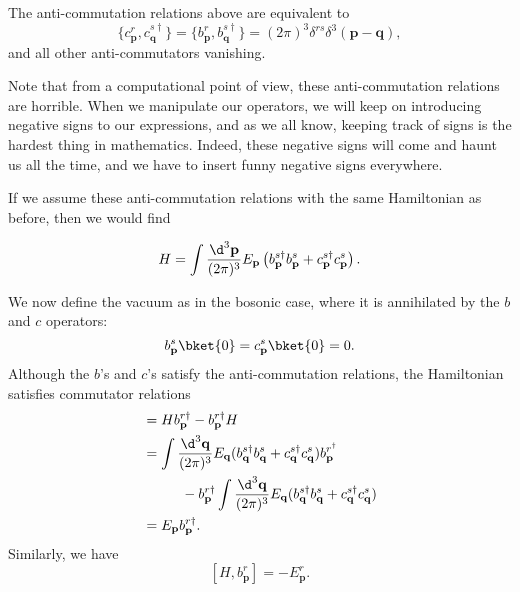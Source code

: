 \documentclass[a4paper]{article}
\begin{document}
\begin{prop}
  The anti-commutation relations above are equivalent to
\[
  \{c_\mathbf{p}^r, c_\mathbf{q}^{s\dagger}\} = \{b_\mathbf{p}^r, b_\mathbf{q}^{s\dagger}\} = (2\pi)^3 \delta^{rs} \delta^3(\mathbf{p} - \mathbf{q}),
\]
and all other anti-commutators vanishing.
\end{prop}
Note that from a computational point of view, these anti-commutation relations are horrible. When we manipulate our operators, we will keep on introducing negative signs to our expressions, and as we all know, keeping track of signs is the hardest thing in mathematics. Indeed, these negative signs will come and haunt us all the time, and we have to insert funny negative signs everywhere.

If we assume these anti-commutation relations with the same Hamiltonian as before, then we would find
\begin{prop}
  \[
    H = \int \frac{\d^3 \mathbf{p}}{(2\pi)^3} E_\mathbf{p} \left(b_\mathbf{p}^{s\dagger} b_\mathbf{p}^s + c_\mathbf{p}^{s\dagger}c_\mathbf{p}^s\right).
  \]
\end{prop}
We now define the vacuum as in the bosonic case, where it is annihilated by the $b$ and $c$ operators:
\[
  b_\mathbf{p}^s\bket{0} = c_\mathbf{p}^s \bket{0} = 0.
\]
Although the $b$'s and $c$'s satisfy the anti-commutation relations, the Hamiltonian satisfies commutator relations
\begin{align*}
  [H, b_\mathbf{p}^{r\dagger}] &= H b_\mathbf{p}^{r\dagger} - b_\mathbf{p}^{r\dagger} H \\
  &= \int \frac{\d^3 \mathbf{q}}{(2\pi)^3} E_\mathbf{q} (b_\mathbf{q}^{s\dagger} b_\mathbf{q}^s + c_\mathbf{q}^{s\dagger}c_\mathbf{q}^s) b_\mathbf{p}^{r^\dagger}\\
  &\hphantom{=}\quad\quad - b_\mathbf{p}^{r\dagger} \int \frac{\d^3 \mathbf{q}}{(2\pi)^3} E_\mathbf{q}(b_\mathbf{q}^{s\dagger} b_\mathbf{q}^s + c_\mathbf{q}^{s\dagger}c_\mathbf{q}^s)\\
  &= E_\mathbf{p} b_\mathbf{p}^{r\dagger}.
\end{align*}
Similarly, we have
\[
  [H, b_\mathbf{p}^r] = -E_\mathbf{p}^r.
\]
\end{document}
